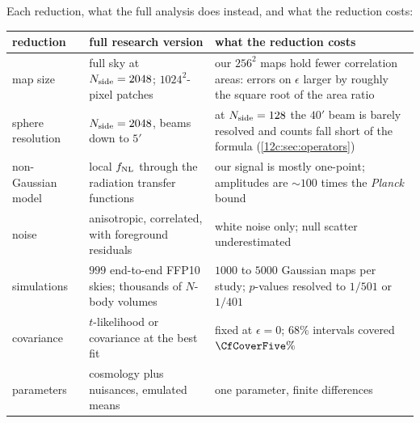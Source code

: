 Each reduction, what the full analysis does instead, and what the reduction costs:

\begin{center}
\small
\renewcommand{\arraystretch}{1.15}
\begin{tabularx}{\linewidth}{@{}>{\raggedright\arraybackslash}p{2.4cm}>{\raggedright\arraybackslash}X>{\raggedright\arraybackslash}X@{}}
\toprule
reduction & full research version & what the reduction costs\\
\midrule
map size & full sky at $N_{\rm side}=2048$; $1024^2$-pixel patches & our $256^2$ maps hold fewer correlation areas: errors on $\epsilon$ larger by roughly
the square root of the area ratio\\
sphere resolution & $N_{\rm side}=2048$, beams down to $5'$ & at $N_{\rm side}=128$ the $40'$ beam is barely resolved and counts fall short of the
formula (\cref{12c:sec:operators})\\
non-Gaussian model & local $f_{\rm NL}$ through the radiation transfer functions & our signal is mostly one-point; amplitudes are $\sim\!100$ times
the \textit{Planck} bound\\
noise & anisotropic, correlated, with foreground residuals & white noise only; null scatter underestimated\\
simulations & $999$ end-to-end FFP10 skies; thousands of $N$-body volumes & $1000$ to $5000$ Gaussian maps per study; $p$-values resolved to
$1/501$ or $1/401$\\
covariance & $t$-likelihood or covariance at the best fit & fixed at $\epsilon=0$; $68\%$ intervals covered $\CfCoverFive\%$\\
parameters & cosmology plus nuisances, emulated means & one parameter, finite differences\\
\bottomrule
\end{tabularx}
\end{center}


